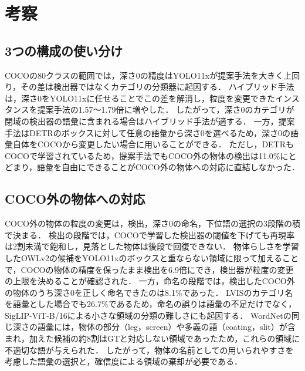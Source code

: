 \section{考察}
\subsection{3つの構成の使い分け}
COCOの80クラスの範囲では，深さ0の精度はYOLO11xが提案手法を大きく上回り，その差は検出器ではなくカテゴリの分類器に起因する．
ハイブリッド手法は，深さ0をYOLO11xに任せることでこの差を解消し，粒度を変更できたインスタンスを提案手法の1.57〜1.79倍に増やした．
したがって，深さ0のカテゴリが閉域の検出器の語彙に含まれる場合はハイブリッド手法が適する．
一方，提案手法はDETRのボックスに対して任意の語彙から深さ0を選べるため，深さ0の語彙自体をCOCOから変更したい場合に用いることができる．
ただし，DETRもCOCOで学習されているため，提案手法でもCOCO外の物体の検出は11.0\%にとどまり，語彙を自由にできることがCOCO外の物体への対応に直結しなかった．

\subsection{COCO外の物体への対応}
COCO外の物体の粒度の変更は，検出，深さ0の命名，下位語の選択の3段階の積で決まる．
検出の段階では，COCOで学習した検出器の閾値を下げても再現率は2割未満で飽和し，見落とした物体は後段で回復できない．
物体らしさを学習したOWLv2の候補をYOLO11xのボックスと重ならない領域に限って加えることで，COCOの物体の精度を保ったまま検出を6.9倍にでき，検出器が粒度の変更の上限を決めることが確認された．
一方，命名の段階では，検出したCOCO外の物体のうち深さ0を正しく命名できたのは8.1\%であった．
LVISのカテゴリ名を語彙とした場合でも26.7\%であるため，命名の誤りは語彙の不足だけでなく，SigLIP-ViT-B/16による小さな領域の分類の難しさにも起因する．
WordNetの同じ深さの語彙には，物体の部分（leg，screen）や多義の語（coating，slit）が含まれ，加えた候補の約8割はGTと対応しない領域であったため，これらの領域に不適切な語が与えられた．
したがって，物体の名前としての用いられやすさを考慮した語彙の選択と，確信度による領域の棄却が必要である．

